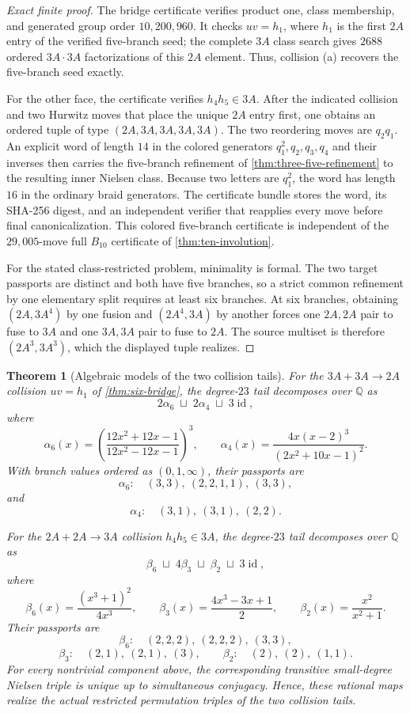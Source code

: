 \documentclass[11pt]{article}
\newtheorem{theorem}{Theorem}[section]
\theoremstyle{remark}
\newcommand{\Q}{\mathbb Q}
\begin{document}
\begin{proof}[Exact finite proof]
The bridge certificate verifies product one, class membership, and generated group order $10{,}200{,}960$.  It checks $uv=h_1$, where $h_1$ is the first $2A$ entry of the verified five-branch seed; the complete $3A$ class search gives $2688$ ordered $3A\cdot3A$ factorizations of this $2A$ element.  Thus, collision \textnormal{(a)} recovers the five-branch seed exactly.

For the other face, the certificate verifies $h_4h_5\in3A$.  After the indicated collision and two Hurwitz moves that place the unique $2A$ entry first, one obtains an ordered tuple of type $(2A,3A,3A,3A,3A)$.  The two reordering moves are $q_2q_1$.  An explicit word of length $14$ in the colored generators $q_1^2,q_2,q_3,q_4$ and their inverses then carries the five-branch refinement of \cref{thm:three-five-refinement} to the resulting inner Nielsen class.  Because two letters are $q_1^2$, the word has length $16$ in the ordinary braid generators.  The certificate bundle stores the word, its SHA-256 digest, and an independent verifier that reapplies every move before final canonicalization.  This colored five-branch certificate is independent of the $29{,}005$-move full $B_{10}$ certificate of \cref{thm:ten-involution}.

For the stated class-restricted problem, minimality is formal.  The two target passports are distinct and both have five branches, so a strict common refinement by one elementary split requires at least six branches.  At six branches, obtaining $(2A,3A^4)$ by one fusion and $(2A^4,3A)$ by another forces one $2A,2A$ pair to fuse to $3A$ and one $3A,3A$ pair to fuse to $2A$.  The source multiset is therefore $(2A^3,3A^3)$, which the displayed tuple realizes.
\end{proof}

\begin{theorem}[Algebraic models of the two collision tails]\label{thm:collision-tails}
For the $3A+3A\to2A$ collision $uv=h_1$ of \cref{thm:six-bridge}, the degree-$23$ tail decomposes over $\Q$ as
\[
 2\alpha_6\;\sqcup\;2\alpha_4\;\sqcup\;3\operatorname{id},
\]
where
\[
 \boxed{\alpha_6(x)=\left(\frac{12x^2+12x-1}{12x^2-12x-1}\right)^3},
 \qquad
 \boxed{\alpha_4(x)=\frac{4x(x-2)^3}{(2x^2+10x-1)^2}}.
\]
With branch values ordered as $(0,1,\infty)$, their passports are
\[
 \alpha_6:\quad (3,3),\ (2,2,1,1),\ (3,3),
\]
and
\[
 \alpha_4:\quad (3,1),\ (3,1),\ (2,2).
\]

For the $2A+2A\to3A$ collision $h_4h_5\in3A$, the degree-$23$ tail decomposes over $\Q$ as
\[
 \beta_6\;\sqcup\;4\beta_3\;\sqcup\;\beta_2\;\sqcup\;3\operatorname{id},
\]
where
\[
 \boxed{\beta_6(x)=\frac{(x^3+1)^2}{4x^3}},
 \qquad
 \boxed{\beta_3(x)=\frac{4x^3-3x+1}{2}},
 \qquad
 \boxed{\beta_2(x)=\frac{x^2}{x^2+1}}.
\]
Their passports are
\[
 \beta_6:\quad (2,2,2),\ (2,2,2),\ (3,3),
\]
\[
 \beta_3:\quad (2,1),\ (2,1),\ (3),
 \qquad
 \beta_2:\quad (2),\ (2),\ (1,1).
\]
For every nontrivial component above, the corresponding transitive small-degree Nielsen triple is unique up to simultaneous conjugacy.  Hence, these rational maps realize the actual restricted permutation triples of the two collision tails.
\end{theorem}
\end{document}
